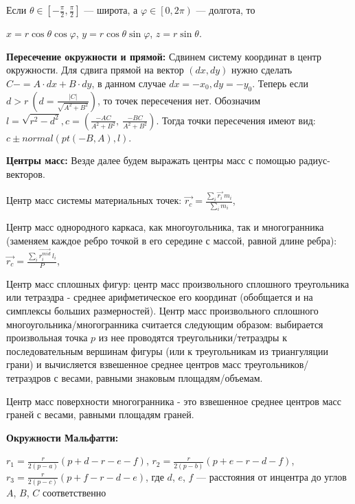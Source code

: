 Если $\theta\in \left [ -\frac{\pi}{2}, \frac{\pi}{2} \right ]$ --- широта, а
$\varphi\in \left [ 0, 2\pi \right )$ --- долгота, то

$x=r\cos\theta \cos\varphi$,
$y=r\cos\theta \sin\varphi$,
$z=r\sin\theta$.

\textbf{Пересечение окружности и прямой:}
Сдвинем систему координат в центр окружности. Для сдвига прямой на вектор $(dx, dy)$ нужно сделать $C -= A \cdot dx + B \cdot dy$,
в данном случае $dx = -x_0, dy = -y_0$. Теперь если $d > r\ (d=\frac{|C|}{\sqrt{A^2+B^2}})$, то точек пересечения нет.
Обозначим $l=\sqrt{r^2-d^2}, c = (\frac{-AC}{A^2+B^2},\ \frac{-BC}{A^2+B^2})$. Тогда точки пересечения имеют вид:
$c \pm normal(pt(-B, A), l)$.

\textbf{Центры масс:}
Везде далее будем выражать центры масс с помощью радиус-векторов.

Центр масс системы материальных точек: $\vec{r_c}=\frac{\sum \limits_{i} \vec{r_i}\ m_i}{\sum \limits_{i} m_i}$,

Центр масс однородного каркаса, как многоугольника, так и многогранника (заменяем каждое ребро точкой в его середине с массой, равной длине ребра):
$\vec{r_c}=\frac{\sum \limits_{i} \vec{r_{i}^{mid}}\ l_i}{P}$,

Центр масс сплошных фигур: центр масс произвольного сплошного треугольника или тетраэдра - среднее арифметическое его координат (обобщается и на симплексы больших размерностей).
Центр масс произвольного сплошного многоугольника/многогранника считается следующим образом: выбирается произвольная точка $p$
из нее проводятся треугольники/тетраэдры к последовательным вершинам фигуры (или к треугольникам из триангуляции грани)
и вычисляется взвешенное среднее центров масс треугольников/тетраэдров с весами, равными знаковым площадям/объемам.

Центр масс поверхности многогранника - это взвешенное среднее центров масс граней с весами, равными площадям граней.

\textbf{Окружности Мальфатти:}

$r_1=\frac{r}{2(p-a)}(p+d-r-e-f)$, $r_2=\frac{r}{2(p-b)}(p+e-r-d-f)$, $r_3=\frac{r}{2(p-c)}(p+f-r-d-e)$, где $d$, $e$, $f$ --- расстояния от инцентра до углов $A$, $B$, $C$ соответственно

